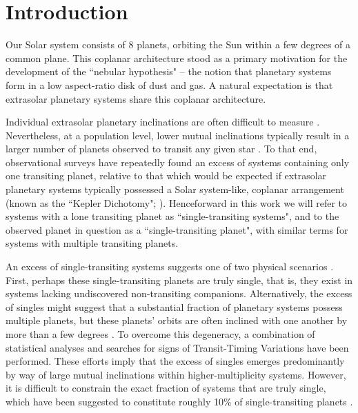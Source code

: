 \documentclass[twocolumn]{aastex63}
\begin{document}
\section{Introduction}

Our Solar system consists of 8 planets, orbiting the Sun within a few degrees of a common plane. This coplanar architecture stood as a primary motivation for the development of the ``nebular hypothesis" \citep{Kant1755,Laplace1796} -- the notion that planetary systems form in a low aspect-ratio disk of dust and gas. A natural expectation is that extrasolar planetary systems share this coplanar architecture. 

Individual extrasolar planetary inclinations are often difficult to measure \citep{fabrycky2014architecture,winn2015occurrence}. Nevertheless, at a population level, lower mutual inclinations typically result in a larger number of planets observed to transit any given star \citep{ragozzine2010value,lissauer2011architecture,he2019architectures}. To that end, observational surveys have repeatedly found an excess of systems containing only one transiting planet, %
relative to that which would be expected if extrasolar planetary systems typically possessed a Solar system-like, coplanar arrangement (known as the ``Kepler Dichotomy"; \citealt{johansen2012can,ballard2016kepler,zhu201830}). Henceforward in this work we will refer to systems with a lone transiting planet as ``single-transiting systems", and to the observed planet in question as a ``single-transiting planet", with similar terms for systems with multiple transiting planets. 

An excess of single-transiting systems suggests one of two physical scenarios  \citep{lissauer2011architecture,johansen2012can,ballard2016kepler}. First, perhaps these single-transiting planets are truly single, that is, they exist in systems lacking undiscovered non-transiting companions. Alternatively, the excess of singles might suggest that a substantial fraction of planetary systems possess multiple planets, but these planets' orbits are often inclined with one another by more than a few degrees \citep{johansen2012can,sanchis2014study, adams2020ultra}. To overcome this degeneracy, a combination of statistical analyses \citep{he2019architectures} and searches for signs of Transit-Timing Variations \citep{zhu201830} have been performed. These efforts imply that the excess of singles emerges predominantly by way of large mutual inclinations within higher-multiplicity systems. However, it is difficult to constrain the exact fraction of systems that are truly single, which have been suggested to constitute roughly 10\% of single-transiting planets \citep{he2020architecturesb}.
\end{document}
